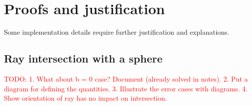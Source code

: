 \section{Proofs and justification}
Some implementation details require further justification and explanations.

\subsection{Ray intersection with a sphere}
\textcolor{red}{TODO:
1. What about b = 0 case? Document (already solved in notes).
2. Put a diagram for defining the quantities.
3. Illustrate the error cases with diagrams.
4. Show orientation of ray has no impact on intersection.}

